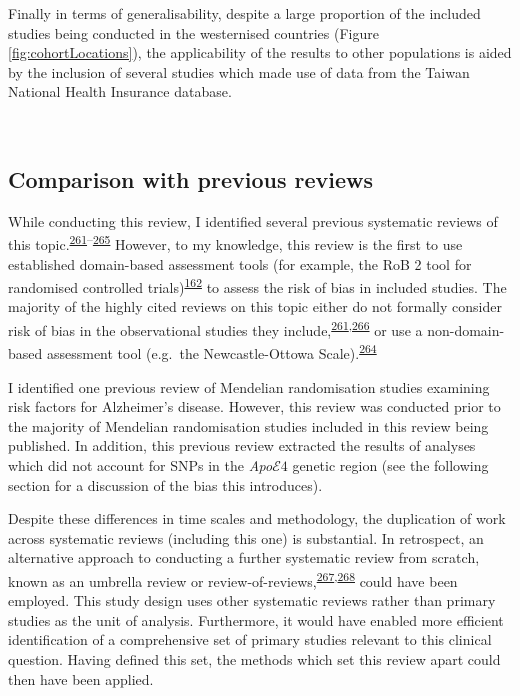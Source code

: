 \documentclass[a4paper, twoside]{templates/ociamthesis}
\begin{document}
Finally in terms of generalisability, despite a large proportion of the included studies being conducted in the westernised countries (Figure \ref{fig:cohortLocations}), the applicability of the results to other populations is aided by the inclusion of several studies which made use of data from the Taiwan National Health Insurance database.

~

\hypertarget{rev-previous-reviews}{%
\subsection{Comparison with previous reviews}\label{rev-previous-reviews}}

While conducting this review, I identified several previous systematic reviews of this topic.\textsuperscript{\protect\hyperlink{ref-chu2018}{261}--\protect\hyperlink{ref-kuzma2018risk}{265}} However, to my knowledge, this review is the first to use established domain-based assessment tools (for example, the RoB 2 tool for randomised controlled trials)\textsuperscript{\protect\hyperlink{ref-sterne2019}{162}} to assess the risk of bias in included studies. The majority of the highly cited reviews on this topic either do not formally consider risk of bias in the observational studies they include,\textsuperscript{\protect\hyperlink{ref-chu2018}{261},\protect\hyperlink{ref-power2015}{266}} or use a non-domain-based assessment tool (e.g.~the Newcastle-Ottowa Scale).\textsuperscript{\protect\hyperlink{ref-poly2020}{264}}

I identified one previous review of Mendelian randomisation studies examining risk factors for Alzheimer's disease. However, this review was conducted prior to the majority of Mendelian randomisation studies included in this review being published. In addition, this previous review extracted the results of analyses which did not account for SNPs in the \emph{Apo}\(\mathcal{E}4\) genetic region (see the following section for a discussion of the bias this introduces).

Despite these differences in time scales and methodology, the duplication of work across systematic reviews (including this one) is substantial. In retrospect, an alternative approach to conducting a further systematic review from scratch, known as an umbrella review or review-of-reviews,\textsuperscript{\protect\hyperlink{ref-aromataris2015}{267},\protect\hyperlink{ref-smith2011}{268}} could have been employed. This study design uses other systematic reviews rather than primary studies as the unit of analysis. Furthermore, it would have enabled more efficient identification of a comprehensive set of primary studies relevant to this clinical question. Having defined this set, the methods which set this review apart could then have been applied.
\end{document}
